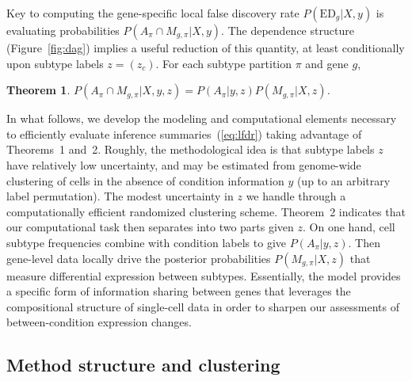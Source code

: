 \documentclass[aoas,preprint]{imsart}
\newtheorem{theorem}{Theorem}
\begin{document}
Key to computing the gene-specific 
local false discovery rate $P(\text{ED}_g|X,y)$ is
evaluating probabilities $P\left(A_\pi \cap M_{g,\pi} |X,y \right)$.
The dependence structure (Figure~\ref{fig:dag}) implies a useful reduction of this
quantity, at least conditionally upon subtype labels $z=(z_c)$. For each 
subtype partition $\pi$ and gene $g$,

\begin{theorem}  
 $P\left(A_\pi \cap M_{g,\pi} |X,y,z \right) 
  =  P\left(A_\pi |y,z \right) 
                      P\left(M_{g,\pi}| X,z \right)$.
\end{theorem}

In what follows, we develop the  modeling and computational elements necessary  to efficiently evaluate inference summaries~(\ref{eq:lfdr}) taking advantage of 
Theorems~1 and~2.  Roughly, the methodological idea is that subtype labels $z$
have relatively low uncertainty, and may be estimated from genome-wide 
clustering of cells in the absence of condition information $y$ (up to an arbitrary label permutation). 
The modest uncertainty in $z$
we handle through a computationally efficient randomized clustering scheme.
 Theorem~2 indicates that our computational task then separates into
two parts given $z$.  On one hand, cell subtype frequencies 
combine with condition labels to give
$P\left(A_\pi |y,z \right)$. Then gene-level data
locally drive the posterior probabilities $P\left(M_{g,\pi}| X,z \right)$ that
measure differential expression between subtypes. 
Essentially, the model provides a specific form of information 
sharing between genes  that leverages the compositional structure of single-cell 
data in order to sharpen our assessments of between-condition expression changes. 


\subsection{Method structure and clustering}
\end{document}
